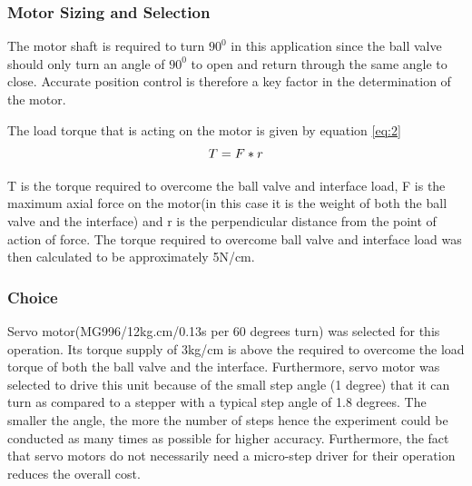 \subsubsection{Motor Sizing and Selection}
\par
The motor shaft is required to turn $90^{0}$ in this application since the ball valve should only turn an angle of $90^{0}$ to open and return through the same angle to close. Accurate position control is therefore a key factor in the determination of the motor.
\par
The load torque that is acting on the motor is given by equation \ref{eq:2}
\begin{equation}
\centering
T=  F * r
\label{eq:2}
\end{equation}
\par
T is the torque required to overcome the ball valve and interface load, F is the maximum axial force on the motor(in this case it is the weight of both the ball valve and the interface) and r is the perpendicular distance from the point of action of force. The torque required to overcome ball valve and interface load was then calculated to be  approximately 5N/cm.

\subsubsection{Choice}
\par
Servo motor(MG996/12kg.cm/0.13s per 60 degrees turn) was selected for this operation. Its torque supply of 3kg/cm is above the required to overcome the load torque of both the ball valve and the interface. Furthermore, servo motor was selected to drive this unit because of the small step angle (1 degree) that it can turn as compared to a stepper with a typical step angle of 1.8 degrees. The smaller the angle, the more the number of steps hence the experiment could be conducted as many times as possible for higher accuracy. Furthermore, the fact that servo motors do not necessarily need a micro-step driver for their operation reduces the overall cost.

